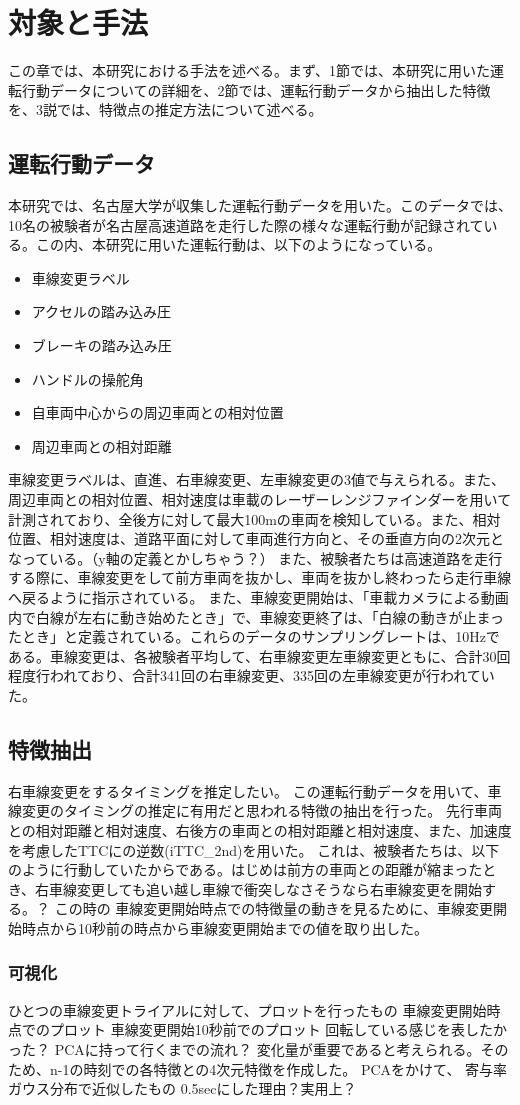 \chapter{対象と手法}
この章では、本研究における手法を述べる。まず、1節では、本研究に用いた運転行動データについての詳細を、2節では、運転行動データから抽出した特徴を、3説では、特徴点の推定方法について述べる。
\section{運転行動データ}
本研究では、名古屋大学が収集した運転行動データを用いた。このデータでは、10名の被験者が名古屋高速道路を走行した際の様々な運転行動が記録されている。この内、本研究に用いた運転行動は、以下のようになっている。
\begin{itemize}
 \item 車線変更ラベル
 \item アクセルの踏み込み圧
 \item ブレーキの踏み込み圧
 \item ハンドルの操舵角
 \item 自車両中心からの周辺車両との相対位置
 \item 周辺車両との相対距離
\end{itemize}
車線変更ラベルは、直進、右車線変更、左車線変更の3値で与えられる。また、周辺車両との相対位置、相対速度は車載のレーザーレンジファインダーを用いて計測されており、全後方に対して最大100mの車両を検知している。また、相対位置、相対速度は、道路平面に対して車両進行方向と、その垂直方向の2次元となっている。（y軸の定義とかしちゃう？）
また、被験者たちは高速道路を走行する際に、車線変更をして前方車両を抜かし、車両を抜かし終わったら走行車線へ戻るように指示されている。
また、車線変更開始は、「車載カメラによる動画内で白線が左右に動き始めたとき」で、車線変更終了は、「白線の動きが止まったとき」と定義されている。これらのデータのサンプリングレートは、10Hzである。車線変更は、各被験者平均して、右車線変更左車線変更ともに、合計30回程度行われており、合計341回の右車線変更、335回の左車線変更が行われていた。
\section{特徴抽出}
右車線変更をするタイミングを推定したい。
この運転行動データを用いて、車線変更のタイミングの推定に有用だと思われる特徴の抽出を行った。
先行車両との相対距離と相対速度、右後方の車両との相対距離と相対速度、また、加速度を考慮したTTCにの逆数(iTTC\_2nd)を用いた。
これは、被験者たちは、以下のように行動していたからである。はじめは前方の車両との距離が縮まったとき、右車線変更しても追い越し車線で衝突しなさそうなら右車線変更を開始する。？
この時の
車線変更開始時点での特徴量の動きを見るために、車線変更開始時点から10秒前の時点から車線変更開始までの値を取り出した。

\subsection{可視化}
ひとつの車線変更トライアルに対して、プロットを行ったもの
車線変更開始時点でのプロット
車線変更開始10秒前でのプロット
回転している感じを表したかった？
PCAに持って行くまでの流れ？
変化量が重要であると考えられる。そのため、n-1の時刻での各特徴との4次元特徴を作成した。
PCAをかけて、
寄与率
ガウス分布で近似したもの
0.5secにした理由？実用上？
